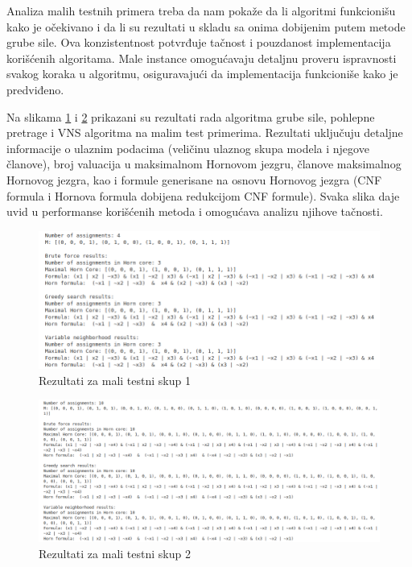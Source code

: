 \documentclass[12pt,oneside]{memoir}
\begin{document}
Analiza malih testnih primera treba da nam pokaže da li algoritmi funkcionišu kako je očekivano i da li su rezultati u skladu sa onima dobijenim putem metode grube sile. Ova konzistentnost potvrđuje tačnost i pouzdanost implementacija korišćenih algoritama. Male instance omogućavaju detaljnu proveru ispravnosti svakog koraka u algoritmu, osiguravajući da implementacija funkcioniše kako je predviđeno.

Na slikama \ref{fig:slika1} i \ref{fig:slika2} prikazani su rezultati rada algoritma grube sile, pohlepne pretrage i VNS algoritma na malim test primerima. Rezultati uključuju detaljne informacije o ulaznim podacima (veličinu ulaznog skupa modela i njegove članove), broj valuacija u maksimalnom Hornovom jezgru, članove maksimalnog Hornovog jezgra, kao i formule generisane na osnovu Hornovog jezgra (CNF formula i Hornova formula dobijena redukcijom CNF formule). Svaka slika daje uvid u performanse korišćenih metoda i omogućava analizu njihove tačnosti.

\begin{figure}[H]
    \centering
    \includegraphics[width=1\linewidth]{small_test_1.png}
    \caption{Rezultati za mali testni skup 1}
    \label{fig:slika1}
\end{figure}

\begin{figure}[H]
    \centering
    \includegraphics[width=1\linewidth]{small_test_2.png}
    \caption{Rezultati za mali testni skup 2}
    \label{fig:slika2}
\end{figure}
\end{document}
